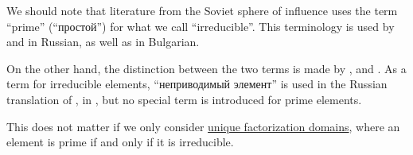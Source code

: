 \begin{comments}
  \item We should note that literature from the Soviet sphere of influence uses the term \enquote{prime} (\enquote{простой}) for what we call \enquote{irreducible}. This terminology is used by  and  in Russian, as well as  in Bulgarian.

  On the other hand, the distinction between the two terms is made by ,  and \cite[246]{Aluffi2009}. As a term for irreducible elements, \enquote{неприводимый элемент} is used in the Russian translation of \cite{Lang2002}, in \cite[89]{Костиркин1968Ленг}, but no special term is introduced for prime elements.

  This does not matter if we only consider \hyperref[def:unique_factorization_domain]{unique factorization domains}, where an element is prime if and only if it is irreducible.
\end{comments}

